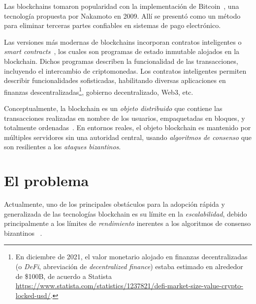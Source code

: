 Las blockchains tomaron
popularidad con la implementación de Bitcoin~\cite{nakamoto06bitcoin},
una tecnología propuesta por Nakamoto en 2009.
Allí se presentó como un método para eliminar terceras partes confiables en sistemas
de pago electrónico.
%

Las versiones más modernas de blockchains incorporan contratos inteligentes o
\textit{smart contracts}~\cite{szabo96smart,wood2014ethereum},
los cuales son programas de estado inmutable alojados en la blockchain. Dichos
programas describen la funcionalidad de las transacciones, incluyendo el intercambio
de criptomonedas.
%
Los contratos inteligentes permiten describir funcionalidades sofisticadas, habilitando
diversas aplicaciones en finanzas descentralizadas\footnote{En diciembre de 2021,
el valor monetario alojado en finanzas decentralizadas (o \emph{DeFi}, abreviación de \emph{decentralized finance})
estaba estimado en alrededor de \$100B, de acuerdo a Statista
\url{https://www.statista.com/statistics/1237821/defi-market-size-value-crypto-locked-usd/}.},
gobierno decentralizado, Web3, etc.
%

Conceptualmente, la blockchain es un \textit{objeto distribuido}
que contiene las transacciones realizadas
en nombre de los usuarios, empaquetadas en bloques, y totalmente
ordenadas~\cite{anta2018formalizing,anta2021principles}.
%
En entornos reales, el objeto blockchain es mantenido por múltiples servidores
sin una autoridad central, usando \emph{algoritmos de consenso} que son resilientes a los
\emph{ataques bizantinos}.
%



\section{El problema}

Actualmente, uno de los principales obstáculos para la adopción rápida y generalizada
de las tecnologías blockchain es su límite en la \emph{escalabilidad}, debido principalmente a los límites
de \emph{rendimiento} inerentes a los algoritmos de consenso bizantinos
~\cite{Tyagi@BlockchainScalabilitySol,Croman2016ScalingDecentralizedBlockchain}.

